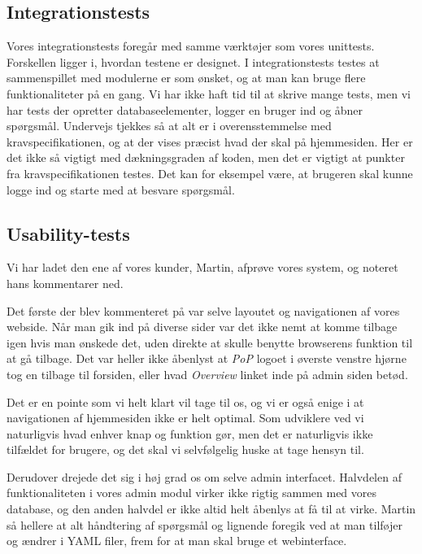 \documentclass[11pt, a4paper]{article}
\begin{document}
\FloatBarrier

\subsection{Integrationstests}
\label{sub:integrationstests}
Vores integrationstests foregår med samme værktøjer som vores unittests. Forskellen ligger i, hvordan testene er designet. I integrationstests testes at sammenspillet med modulerne er som ønsket, og at man kan bruge flere funktionaliteter på en gang. Vi har ikke haft tid til at skrive mange tests, men vi har tests der opretter databaseelementer, logger en bruger ind og åbner spørgsmål. Undervejs tjekkes så at alt er i overensstemmelse med kravspecifikationen, og at der vises præcist hvad der skal på hjemmesiden. Her er det ikke så vigtigt med dækningsgraden af koden, men det er vigtigt at punkter fra kravspecifikationen testes. Det kan for eksempel være, at brugeren skal kunne logge ind og starte med at besvare spørgsmål.

\subsection{Usability-tests}
\label{sub:usability_tests}
Vi har ladet den ene af vores kunder, Martin, afprøve vores system, og noteret hans kommentarer ned.

Det første der blev kommenteret på var selve layoutet og navigationen af vores webside. Når man gik ind på diverse sider var det ikke nemt at komme tilbage igen hvis man ønskede det, uden direkte at skulle benytte browserens funktion til at gå tilbage. Det var heller ikke åbenlyst at \emph{PoP} logoet i øverste venstre hjørne tog en tilbage til forsiden, eller hvad \emph{Overview} linket inde på admin siden betød.

Det er en pointe som vi helt klart vil tage til os, og vi er også enige i at navigationen af hjemmesiden ikke er helt optimal. Som udviklere ved vi naturligvis hvad enhver knap og funktion gør, men det er naturligvis ikke tilfældet for brugere, og det skal vi selvfølgelig huske at tage hensyn til.

Derudover drejede det sig i høj grad os om selve admin interfacet. Halvdelen af funktionaliteten i vores admin modul virker ikke rigtig sammen med vores database, og den anden halvdel er ikke altid helt åbenlys at få til at virke. Martin så hellere at alt håndtering af spørgsmål og lignende foregik ved at man tilføjer og ændrer i YAML filer, frem for at man skal bruge et webinterface.
\end{document}
